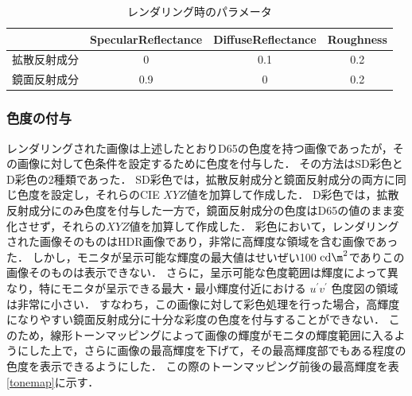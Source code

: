                 \begin{table}[h]
                    \centering
                    \caption{レンダリング時のパラメータ}
                    \begin{tabular}{|l||c|c|c|} \hline
                                               & SpecularReflectance & DiffuseReflectance & Roughness \\ \hline \hline
                        拡散反射成分           & 0                   & 0.1                & 0.2 \\ \hline
                        鏡面反射成分           & 0.9                 & 0                  & 0.2 \\ \hline
                    \end{tabular}
                    \label{render_param}
                \end{table}
            
            \subsubsection{色度の付与}

                レンダリングされた画像は上述したとおりD65の色度を持つ画像であったが，その画像に対して色条件を設定するために色度を付与した．
                その方法はSD彩色とD彩色の2種類であった．
                SD彩色では，拡散反射成分と鏡面反射成分の両方に同じ色度を設定し，それらのCIE $XYZ$値を加算して作成した．
                D彩色では，拡散反射成分にのみ色度を付与した一方で，鏡面反射成分の色度はD65の値のまま変化させず，それらの$XYZ$値を加算して作成した．
                彩色において，レンダリングされた画像そのものはHDR画像であり，非常に高輝度な領域を含む画像であった．
                しかし，モニタが呈示可能な輝度の最大値はせいぜい100 ${\rm cd\m}^2$でありこの画像そのものは表示できない．
                さらに，呈示可能な色度範囲は輝度によって異なり，特にモニタが呈示できる最大・最小輝度付近における $u^{\prime}v^{\prime}$ 色度図の領域は非常に小さい．
                すなわち，この画像に対して彩色処理を行った場合，高輝度になりやすい鏡面反射成分に十分な彩度の色度を付与することができない．
                このため，線形トーンマッピングによって画像の輝度がモニタの輝度範囲に入るようにした上で，さらに画像の最高輝度を下げて，その最高輝度部でもある程度の色度を表示できるようにした．
                この際のトーンマッピング前後の最高輝度を表\ref{tonemap}に示す．

